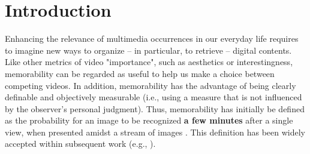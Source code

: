 \documentclass[sigconf]{acmart}
\begin{document}


\maketitle


\section{Introduction}%
Enhancing the relevance of multimedia occurrences in our everyday life requires to imagine new ways to organize -- in particular, to retrieve -- digital contents.
Like other metrics of video "importance", such as aesthetics or interestingness, memorability can be regarded as useful to help us make a choice between competing videos.
In addition, memorability has the advantage of being clearly definable and objectively measurable (i.e., using a measure that is not influenced by the observer's personal judgment).
Thus, memorability has initially be defined as the probability for an image to be recognized \textbf{a few minutes} after a single view, when presented amidst a stream
of images \cite{isola_2011_makes}.
This definition has been widely accepted within subsequent work (e.g., \cite{mancas_2013_memorability,kim_2013_relative,celikkale_2013_visual,khosla_2015_understanding,lahrache_2016_bag}).
\end{document}
